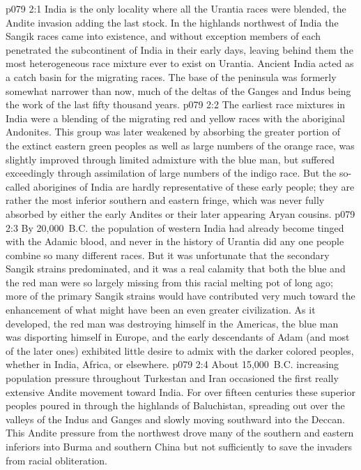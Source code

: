 \vs p079 2:1 India is the only locality where all the Urantia races were blended, the Andite invasion adding the last stock. In the highlands northwest of India the Sangik races came into existence, and without exception members of each penetrated the subcontinent of India in their early days, leaving behind them the most heterogeneous race mixture ever to exist on Urantia. Ancient India acted as a catch basin for the migrating races. The base of the peninsula was formerly somewhat narrower than now, much of the deltas of the Ganges and Indus being the work of the last fifty thousand years.
\vs p079 2:2 The earliest race mixtures in India were a blending of the migrating red and yellow races with the aboriginal Andonites. This group was later weakened by absorbing the greater portion of the extinct eastern green peoples as well as large numbers of the orange race, was slightly improved through limited admixture with the blue man, but suffered exceedingly through assimilation of large numbers of the indigo race. But the so\hyp{}called aborigines of India are hardly representative of these early people; they are rather the most inferior southern and eastern fringe, which was never fully absorbed by either the early Andites or their later appearing Aryan cousins.
\pc \vs p079 2:3 By 20,000~B.C. the population of western India had already become tinged with the Adamic blood, and never in the history of Urantia did any one people combine so many different races. But it was unfortunate that the secondary Sangik strains predominated, and it was a real calamity that both the blue and the red man were so largely missing from this racial melting pot of long ago; more of the primary Sangik strains would have contributed very much toward the enhancement of what might have been an even greater civilization. As it developed, the red man was destroying himself in the Americas, the blue man was disporting himself in Europe, and the early descendants of Adam (and most of the later ones) exhibited little desire to admix with the darker colored peoples, whether in India, Africa, or elsewhere.
\pc \vs p079 2:4 About 15,000~B.C. increasing population pressure throughout Turkestan and Iran occasioned the first really extensive Andite movement toward India. For over fifteen centuries these superior peoples poured in through the highlands of Baluchistan, spreading out over the valleys of the Indus and Ganges and slowly moving southward into the Deccan. This Andite pressure from the northwest drove many of the southern and eastern inferiors into Burma and southern China but not sufficiently to save the invaders from racial obliteration.
